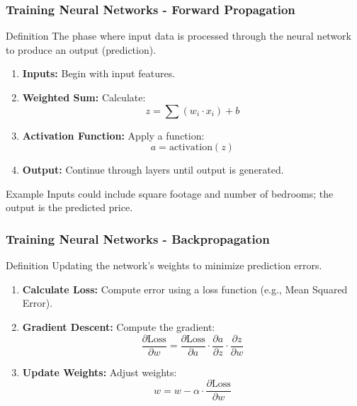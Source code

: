 \documentclass[aspectratio=169]{beamer}
\begin{document}
\begin{frame}[fragile]
    \frametitle{Training Neural Networks - Forward Propagation}
    \begin{block}{Definition}
        The phase where input data is processed through the neural network to produce an output (prediction).
    \end{block}
    
    \begin{enumerate}
        \item \textbf{Inputs:} Begin with input features.
        \item \textbf{Weighted Sum:} Calculate:
        \begin{equation}
            z = \sum (w_i \cdot x_i) + b
        \end{equation}
        \item \textbf{Activation Function:} Apply a function:
        \begin{equation}
            a = \text{activation}(z)
        \end{equation}
        \item \textbf{Output:} Continue through layers until output is generated.
    \end{enumerate}
    
    \begin{block}{Example}
        Inputs could include square footage and number of bedrooms; the output is the predicted price.
    \end{block}
\end{frame}

\begin{frame}[fragile]
    \frametitle{Training Neural Networks - Backpropagation}
    \begin{block}{Definition}
        Updating the network's weights to minimize prediction errors.
    \end{block}

    \begin{enumerate}
        \item \textbf{Calculate Loss:} Compute error using a loss function (e.g., Mean Squared Error).
        \item \textbf{Gradient Descent:} Compute the gradient:
        \begin{equation}
            \frac{\partial \text{Loss}}{\partial w} = \frac{\partial \text{Loss}}{\partial a} \cdot \frac{\partial a}{\partial z} \cdot \frac{\partial z}{\partial w}
        \end{equation}
        \item \textbf{Update Weights:} Adjust weights:
        \begin{equation}
            w = w - \alpha \cdot \frac{\partial \text{Loss}}{\partial w}
        \end{equation}
    \end{enumerate}

\end{frame}
\end{document}
